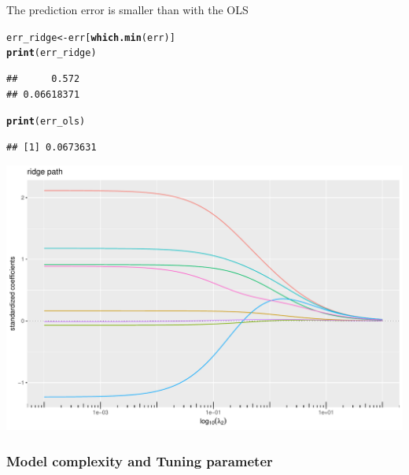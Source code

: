 \documentclass{beamer}\usepackage[]{graphicx}\usepackage[]{color}
\makeatletter
\newcommand{\hlstd}[1]{\textcolor[rgb]{0.345,0.345,0.345}{#1}}%
\newcommand{\hlkwb}[1]{\textcolor[rgb]{0.69,0.353,0.396}{#1}}%
\newcommand{\hlkwd}[1]{\textcolor[rgb]{0.737,0.353,0.396}{\textbf{#1}}}%
\newenvironment{kframe}{%
 \def\at@end@of@kframe{}%
 \ifinner\ifhmode%
  \def\at@end@of@kframe{\end{minipage}}%
  \begin{minipage}{\columnwidth}%
 \fi\fi%
 \def\FrameCommand##1{\hskip\@totalleftmargin \hskip-\fboxsep
 \colorbox{shadecolor}{##1}\hskip-\fboxsep
     \hskip-\linewidth \hskip-\@totalleftmargin \hskip\columnwidth}%
 \MakeFramed {\advance\hsize-\width
   \@totalleftmargin\z@ \linewidth\hsize
   \@setminipage}}%
 {\par\unskip\endMakeFramed%
 \at@end@of@kframe}
\newenvironment{knitrout}{}{} %
\makeatother
\begin{document}
\begin{frame}[containsverbatim]
The prediction error is smaller than with the OLS
\begin{knitrout}\scriptsize
{}\color{fgcolor}\begin{kframe}
\begin{alltt}
\hlstd{err_ridge} \hlkwb{<-} \hlstd{err[}\hlkwd{which.min}\hlstd{(err)]}
\hlkwd{print}\hlstd{(err_ridge)}
\end{alltt}
\begin{verbatim}
##      0.572 
## 0.06618371
\end{verbatim}
\begin{alltt}
\hlkwd{print}\hlstd{(err_ols)}
\end{alltt}
\begin{verbatim}
## [1] 0.0673631
\end{verbatim}
\end{kframe}
\end{knitrout}

\end{frame}

\begin{frame}[containsverbatim]
\begin{knitrout}\scriptsize
{}\color{fgcolor}
\includegraphics[width=.8\textwidth]{figures/rdige_path_prostate-1} 

\end{knitrout}
\end{frame}


\subsubsection{Model complexity and Tuning parameter}
\end{document}
